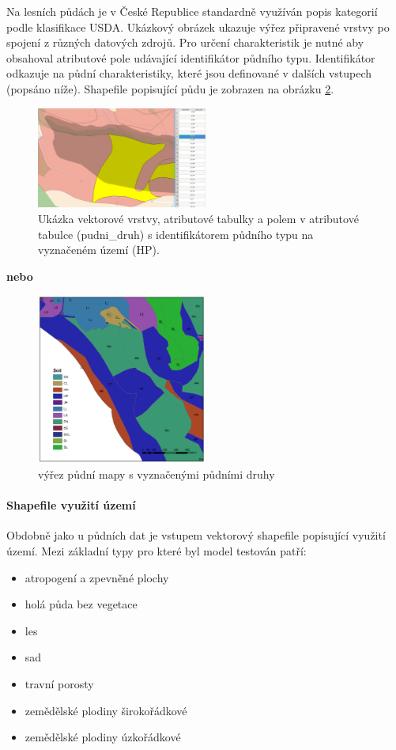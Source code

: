 Na lesních půdách je v České Republice standardně využíván popis kategorií podle klasifikace USDA.
Ukázkový obrázek ukazuje výřez připravené vrstvy po spojení z různých datových zdrojů. Pro určení charakteristik je nutné aby obsahoval atributové pole udávající identifikátor půdního typu. Identifikátor odkazuje na půdní charakteristiky, které jsou definované v dalších vstupech (popsáno níže). Shapefile popisující půdu je zobrazen na obrázku \ref{fig:bykovicepuda}.
\begin{figure}
  \centering
  \includegraphics[width=0.5\textwidth]{./img/pudnityp.png}
  \caption{Ukázka vektorové vrstvy, atributové tabulky a polem v atributové tabulce (pudni\_druh) s identifikátorem půdního typu na vyznačeném území (HP).}
  \label{fig:bykovicepuda}
\end{figure}

\textbf{nebo}

\begin{figure}
  \centering
  \includegraphics[width=0.5\textwidth]{./img/pudy.png}
  \caption{výřez půdní mapy s vyznačenými půdními druhy}
  \label{fig:bykovicepuda}
\end{figure}

 
\paragraph{Shapefile využití území} \label{sec:vstupvegetace}

Obdobně jako u půdních dat je vstupem vektorový shapefile popisující využití území. Mezi základní typy pro které byl model testován patří:
\begin{itemize} \itemsep 0pt
  \item atropogení a zpevněné plochy  
  \item holá půda bez vegetace
  \item les
  \item sad
  \item travní porosty
  \item zemědělské plodiny širokořádkové
  \item zemědělské plodiny úzkořádkové
\end{itemize}


